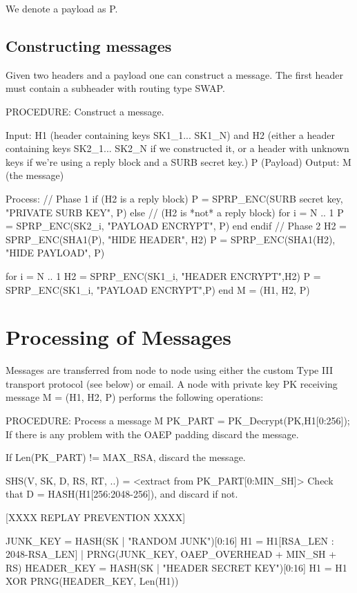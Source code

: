 We denote a payload as P.

\subsection{Constructing messages}

Given two headers and a payload one can construct a
message. The first header must contain a subheader
with routing type SWAP.  

PROCEDURE: Construct a message.

Input: H1 (header containing keys SK1_1... SK1_N)
       and H2 (either a header containing keys SK2_1... SK2_N if
         we constructed it, or a header with unknown keys if we're
         using a reply block and a SURB secret key.)
       P (Payload)
Output: M (the message)

Process:
        // Phase 1
        if (H2 is a reply block)
                P = SPRP_ENC(SURB secret key, "PRIVATE SURB KEY", P)
        else // (H2 is *not* a reply block)
                for i = N .. 1
                        P = SPRP_ENC(SK2_i, "PAYLOAD ENCRYPT", P)
                end
        endif
        // Phase 2
        H2 = SPRP_ENC(SHA1(P), "HIDE HEADER", H2)
        P = SPRP_ENC(SHA1(H2), "HIDE PAYLOAD", P)

        for i = N .. 1
                H2 = SPRP_ENC(SK1_i, "HEADER ENCRYPT",H2)
                P = SPRP_ENC(SK1_i, "PAYLOAD ENCRYPT",P)
        end
        M = (H1, H2, P)

\section{Processing of Messages}

Messages are transferred from node to node using either the custom Type
III transport protocol (see below) or email.  A node with private key
PK receiving message M = (H1, H2, P) performs the following operations:

PROCEDURE: Process a message M
        PK_PART = PK_Decrypt(PK,H1[0:256]);
        If there is any problem with the OAEP padding discard the message.

        If Len(PK_PART) != MAX_RSA, discard the message.

        SHS(V, SK, D, RS, RT, ..) = <extract from PK_PART[0:MIN_SH]>
        Check that D = HASH(H1[256:2048-256]), and discard if not.

        [XXXX REPLAY PREVENTION XXXX]

        JUNK_KEY = HASH(SK | "RANDOM JUNK")[0:16]
        H1 = H1[RSA_LEN : 2048-RSA_LEN] | 
             PRNG(JUNK_KEY, OAEP_OVERHEAD + MIN_SH + RS)
        HEADER_KEY = HASH(SK | "HEADER SECRET KEY")[0:16]
        H1 = H1 XOR PRNG(HEADER_KEY, Len(H1))

